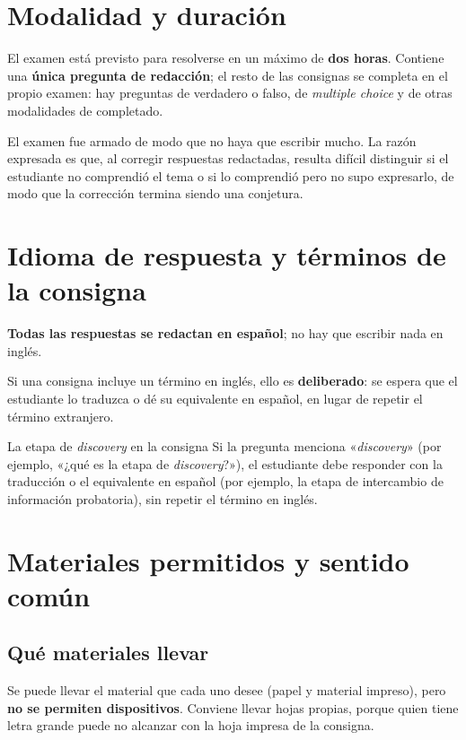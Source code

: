 \documentclass[12pt,oneside]{book}
\begin{document}
\section{Modalidad y duración}

El examen está previsto para resolverse en un máximo de \textbf{dos horas}. Contiene una \textbf{única pregunta de redacción}; el resto de las consignas se completa en el propio examen: hay preguntas de verdadero o falso, de \textit{multiple choice} y de otras modalidades de completado.

El examen fue armado de modo que no haya que escribir mucho. La razón expresada es que, al corregir respuestas redactadas, resulta difícil distinguir si el estudiante no comprendió el tema o si lo comprendió pero no supo expresarlo, de modo que la corrección termina siendo una conjetura.

\section{Idioma de respuesta y términos de la consigna}

\textbf{Todas las respuestas se redactan en español}; no hay que escribir nada en inglés.

Si una consigna incluye un término en inglés, ello es \textbf{deliberado}: se espera que el estudiante lo traduzca o dé su equivalente en español, en lugar de repetir el término extranjero.

\begin{example}{La etapa de \textit{discovery} en la consigna}
Si la pregunta menciona «\textit{discovery}» (por ejemplo, «¿qué es la etapa de \textit{discovery}?»), el estudiante debe responder con la traducción o el equivalente en español (por ejemplo, la etapa de intercambio de información probatoria), sin repetir el término en inglés.
\end{example}

\section{Materiales permitidos y sentido común}

\subsection{Qué materiales llevar}

Se puede llevar el material que cada uno desee (papel y material impreso), pero \textbf{no se permiten dispositivos}. Conviene llevar hojas propias, porque quien tiene letra grande puede no alcanzar con la hoja impresa de la consigna.
\end{document}
